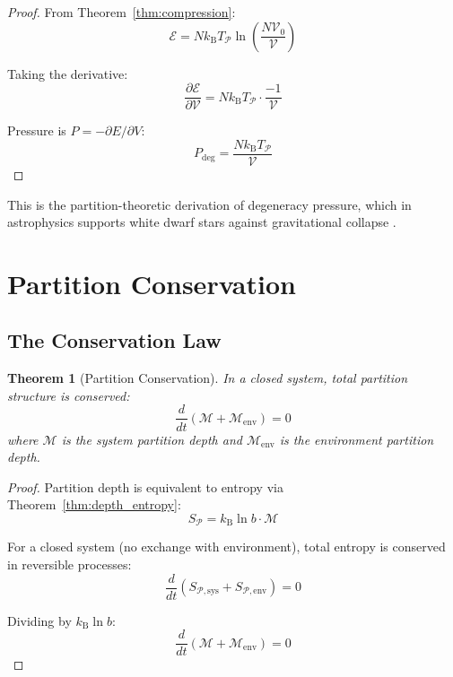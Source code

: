 \documentclass[twocolumn,10pt,a4paper]{article}
\newtheorem{theorem}{Theorem}[section]
\theoremstyle{definition}
\theoremstyle{remark}
\newcommand{\kB}{k_{\mathrm{B}}}
\newcommand{\Partition}{\mathcal{P}}
\newcommand{\Depth}{\mathcal{M}}
\newcommand{\Cost}{\mathcal{E}}
\begin{document}
\begin{proof}
From Theorem~\ref{thm:compression}:
\begin{equation}
    \Cost = N\kB T_{\Partition} \ln\left(\frac{N\mathcal{V}_0}{\mathcal{V}}\right)
\end{equation}

Taking the derivative:
\begin{equation}
    \frac{\partial \Cost}{\partial \mathcal{V}} = N\kB T_{\Partition} \cdot \frac{-1}{\mathcal{V}}
\end{equation}

Pressure is $P = -\partial E/\partial V$:
\begin{equation}
    P_{\text{deg}} = \frac{N\kB T_{\Partition}}{\mathcal{V}}
\end{equation}
\end{proof}

This is the partition-theoretic derivation of degeneracy pressure, which in astrophysics supports white dwarf stars against gravitational collapse \cite{chandrasekhar1931,fowler1926}.

\section{Partition Conservation}
\label{sec:conservation}

\subsection{The Conservation Law}

\begin{theorem}[Partition Conservation]
\label{thm:conservation}
In a closed system, total partition structure is conserved:
\begin{equation}
    \frac{d}{dt}\left(\Depth + \Depth_{\text{env}}\right) = 0
\end{equation}
where $\Depth$ is the system partition depth and $\Depth_{\text{env}}$ is the environment partition depth.
\end{theorem}

\begin{proof}
Partition depth is equivalent to entropy via Theorem~\ref{thm:depth_entropy}:
\begin{equation}
    S_{\Partition} = \kB \ln b \cdot \Depth
\end{equation}

For a closed system (no exchange with environment), total entropy is conserved in reversible processes:
\begin{equation}
    \frac{d}{dt}(S_{\Partition,\text{sys}} + S_{\Partition,\text{env}}) = 0
\end{equation}

Dividing by $\kB \ln b$:
\begin{equation}
    \frac{d}{dt}(\Depth + \Depth_{\text{env}}) = 0
\end{equation}
\end{proof}
\end{document}
